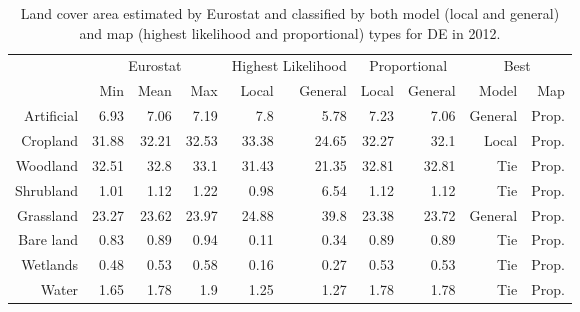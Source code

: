 \begin{table}[H]
\centering
\caption{Land cover area estimated by Eurostat and classified by both model (local and general) and map (highest likelihood and proportional) types for DE in 2012.}

\begin{tabular}{r|rrr|rr|rr|rr}
\toprule
{} & \multicolumn{3}{|c}{Eurostat} & \multicolumn{2}{|c}{Highest Likelihood} & \multicolumn{2}{|c}{Proportional} & \multicolumn{2}{|c}{Best} \\
{} &      Min &   Mean &    Max &              Local & General &        Local & General &    Model &    Map \\
\midrule
Artificial &     6.93 &   7.06 &   7.19 &                7.8 &    5.78 &         7.23 &    7.06 &  General &  Prop. \\
Cropland   &    31.88 &  32.21 &  32.53 &              33.38 &   24.65 &        32.27 &    32.1 &    Local &  Prop. \\
Woodland   &    32.51 &   32.8 &   33.1 &              31.43 &   21.35 &        32.81 &   32.81 &      Tie &  Prop. \\
Shrubland  &     1.01 &   1.12 &   1.22 &               0.98 &    6.54 &         1.12 &    1.12 &      Tie &  Prop. \\
Grassland  &    23.27 &  23.62 &  23.97 &              24.88 &    39.8 &        23.38 &   23.72 &  General &  Prop. \\
Bare land  &     0.83 &   0.89 &   0.94 &               0.11 &    0.34 &         0.89 &    0.89 &      Tie &  Prop. \\
Wetlands   &     0.48 &   0.53 &   0.58 &               0.16 &    0.27 &         0.53 &    0.53 &      Tie &  Prop. \\
Water      &     1.65 &   1.78 &    1.9 &               1.25 &    1.27 &         1.78 &    1.78 &      Tie &  Prop. \\
\bottomrule
\end{tabular}
\end{table}

